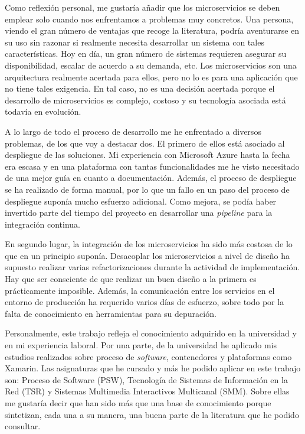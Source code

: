 \documentclass[11pt,spanish,listoffigures]{tfgetsinf}
\begin{document}
Como reflexión personal, me gustaría añadir que los microservicios se deben emplear solo cuando nos enfrentamos a problemas muy concretos. Una persona, viendo el gran número de ventajas que recoge la literatura, podría aventurarse en su uso sin razonar si realmente necesita desarrollar un sistema con tales características. Hoy en día, un gran número de sistemas requieren asegurar su disponibilidad, escalar de acuerdo a su demanda, etc. Los microservicios son una arquitectura realmente acertada para ellos, pero no lo es para una aplicación que no tiene tales exigencia. En tal caso, no es una decisión acertada porque el desarrollo de microservicios es complejo, costoso y su tecnología asociada está todavía en evolución.

A lo largo de todo el proceso de desarrollo me he enfrentado a diversos problemas, de los que voy a destacar dos. El primero de ellos está asociado al despliegue de las soluciones. Mi experiencia con Microsoft Azure hasta la fecha era escasa y en una plataforma con tantas funcionalidades me he visto necesitado de una mejor guía en cuanto a documentación. Además, el proceso de despliegue se ha realizado de forma manual, por lo que un fallo en un paso del proceso de despliegue suponía mucho esfuerzo adicional. Como mejora, se podía haber invertido parte del tiempo del proyecto en desarrollar una \textit{pipeline} para la integración continua.

En segundo lugar, la integración de los microservicios ha sido más costosa de lo que en un principio suponía. Desacoplar los microservicios a nivel de diseño ha supuesto realizar varias refactorizaciones durante la actividad de implementación. Hay que ser consciente de que realizar un buen diseño a la primera es prácticamente imposible. Además, la comunicación entre los servicios en el entorno de producción ha requerido varios días de esfuerzo, sobre todo por la falta de conocimiento en herramientas para su depuración.

Personalmente, este trabajo refleja el conocimiento adquirido en la universidad y en mi experiencia laboral. Por una parte, de la universidad he aplicado mis estudios realizados sobre proceso de \textit{software}, contenedores y plataformas como Xamarin. Las asignaturas que he cursado y más he podido aplicar en este trabajo son: Proceso de Software (PSW), Tecnología de Sistemas de Información en la Red (TSR) y Sistemas Multimedia Interactivos Multicanal (SMM). Sobre ellas me gustaría decir que han sido más que una base de conocimiento porque sintetizan, cada una a su manera, una buena parte de la literatura que he podido consultar.
\end{document}

